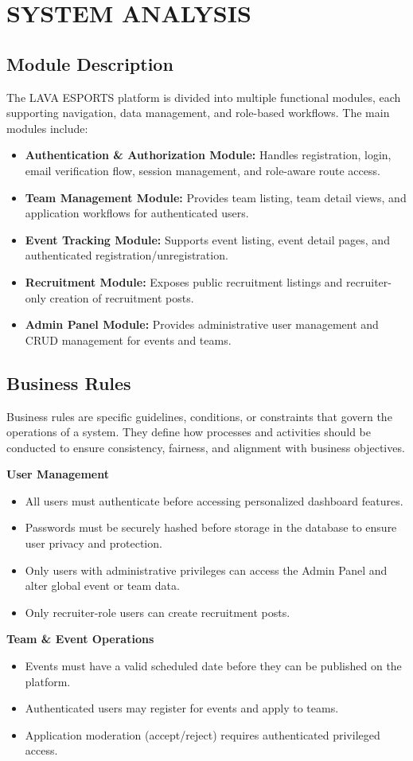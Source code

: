 \chapter{SYSTEM ANALYSIS }
 
 \section{Module Description}
 The LAVA ESPORTS platform is divided into multiple functional modules, each supporting navigation, data management, and role-based workflows. The main modules include:
 \begin{itemize}
    \item \textbf{Authentication \& Authorization Module:} Handles registration, login, email verification flow, session management, and role-aware route access.
    \item \textbf{Team Management Module:} Provides team listing, team detail views, and application workflows for authenticated users.
    \item \textbf{Event Tracking Module:} Supports event listing, event detail pages, and authenticated registration/unregistration.
    \item \textbf{Recruitment Module:} Exposes public recruitment listings and recruiter-only creation of recruitment posts.
    \item \textbf{Admin Panel Module:} Provides administrative user management and CRUD management for events and teams.
\end{itemize}

\section{Business Rules}
Business rules are specific guidelines, conditions, or constraints that govern the operations of a system. They define how processes and activities should be conducted to ensure consistency, fairness, and alignment with business objectives.

\textbf{User Management}
\begin{itemize}
    \item All users must authenticate before accessing personalized dashboard features.
    \item Passwords must be securely hashed before storage in the database to ensure user privacy and protection.
    \item Only users with administrative privileges can access the Admin Panel and alter global event or team data.
    \item Only recruiter-role users can create recruitment posts.
\end{itemize}
\textbf{Team \& Event Operations}
\begin{itemize}
    \item Events must have a valid scheduled date before they can be published on the platform.
    \item Authenticated users may register for events and apply to teams.
    \item Application moderation (accept/reject) requires authenticated privileged access.
\end{itemize}

